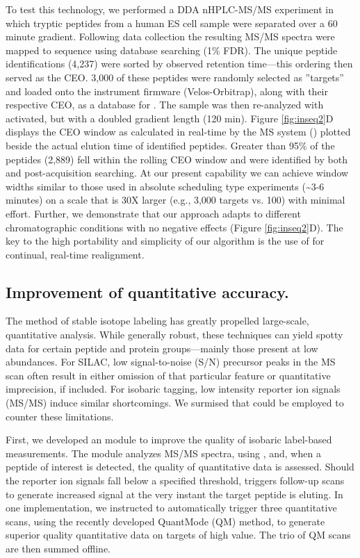 To test this technology, we performed a DDA nHPLC-MS/MS experiment in which tryptic peptides from a human ES cell sample were separated over a 60 minute gradient. Following data collection the resulting MS/MS spectra were mapped to sequence using database searching (1\% FDR). The unique peptide identifications (4,237) were sorted by observed retention time---this ordering then served as the CEO. 3,000 of these peptides were randomly selected as ''targets'' and loaded onto the instrument firmware (Velos-Orbitrap), along with their respective CEO, as a database for \inseq{}. The sample was then re-analyzed with \inseq{} activated, but with a doubled gradient length (120 min). Figure \ref{fig:inseq2}D displays the CEO window as calculated in real-time by the MS system (\inseq{}) plotted beside the actual elution time of identified peptides. Greater than 95\% of the peptides (2,889) fell within the rolling CEO window and were identified by both \inseq{} and post-acquisition searching. At our present capability we can achieve window widths similar to those used in absolute scheduling type experiments (\textasciitilde3-6 minutes) on a scale that is 30X larger (e.g., 3,000 targets vs. 100) with minimal effort.\cite{indexion,integrated} Further, we demonstrate that our approach adapts to different chromatographic conditions with no negative effects (Figure \ref{fig:inseq2}D). The key to the high portability and simplicity of our algorithm is the use of \inseq{} for continual, real-time realignment.

\subsection*{Improvement of quantitative accuracy.}

The method of stable isotope labeling has greatly propelled large-scale, quantitative analysis.\cite{pheromone,8plex,haploid,7tmr,esips,leeyeast} While generally robust, these techniques can yield spotty data for certain peptide and protein groups---mainly those present at low abundances. For SILAC, low signal-to-noise (S/N) precursor peaks in the MS scan often result in either omission of that particular feature or quantitative imprecision, if included.\cite{dynamicrange} For isobaric tagging, low intensity reporter ion signals (MS/MS) induce similar shortcomings.\cite{itraqerror} We surmised that \inseq{} could be employed to counter these limitations.

First, we developed an \inseq{} module to improve the quality of isobaric label-based measurements. The module analyzes MS/MS spectra, using \inseq{}, and, when a peptide of interest is detected, the quality of quantitative data is assessed. Should the reporter ion signals fall below a specified threshold, \inseq{} triggers follow-up scans to generate increased signal at the very instant the target peptide is eluting. In one implementation, we instructed \inseq{} to automatically trigger three quantitative scans, using the recently developed QuantMode (QM) method, to generate superior quality quantitative data on targets of high value.\cite{quantmode} The trio of QM scans are then summed offline.

